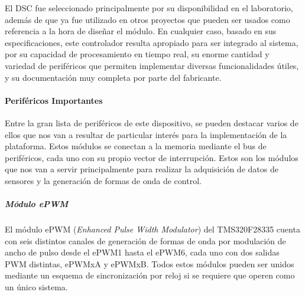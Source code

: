 El DSC fue seleccionado principalmente por su disponibilidad en el laboratorio, además de que ya fue utilizado en otros proyectos que pueden ser usados como referencia a la hora de diseñar el módulo. En cualquier caso, basado en sus especificaciones, este controlador resulta apropiado para ser integrado al sistema, por su capacidad de procesamiento en tiempo real, su enorme cantidad y variedad de periféricos que permiten implementar diversas funcionalidades útiles, y su documentación muy completa por parte del fabricante.\\

\paragraph{Periféricos Importantes}

Entre la gran lista de periféricos de este dispositivo, se pueden destacar varios de ellos que nos van a resultar de particular interés para la implementación de la plataforma. Estos módulos se conectan a la memoria mediante el bus de periféricos, cada uno con su propio vector de interrupción. Estos son los módulos que nos van a servir principalmente para realizar la adquisición de datos de sensores y la generación de formas de onda de control.

\subparagraph{Módulo ePWM}

El módulo ePWM (\textit{Enhanced Pulse Width Modulator}) del TMS320F28335 cuenta con seis distintos canales de generación de formas de onda por modulación de ancho de pulso desde el ePWM1 hasta el ePWM6, cada uno con dos salidas PWM distintas, ePWMxA y ePWMxB. Todos estos módulos pueden ser unidos mediante un esquema de sincronización por reloj si se requiere que operen como un único sistema.\\

